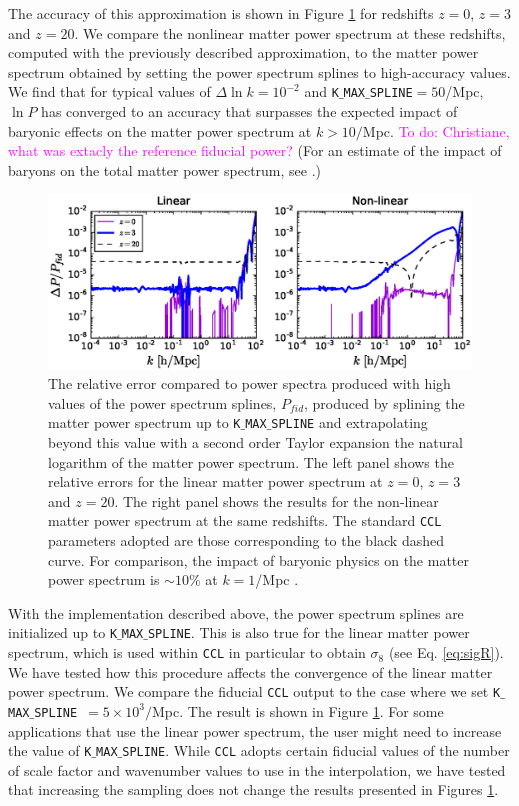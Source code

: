 \documentclass[\docopts]{\docclass}
\newcommand{\todo}[1]{\textcolor{magenta}{To do: #1}}
\newcommand{\ccl}{{\tt CCL}\xspace}
\begin{document}
The accuracy of this approximation is shown in Figure \ref{fig:NLextrapol} for redshifts $z=0$, $z=3$ and $z=20$. We compare the nonlinear matter power spectrum at these redshifts, computed with the previously described approximation, to the matter power spectrum obtained by setting the power spectrum splines to high-accuracy values. We find that for typical values of $\Delta \ln k=10^{-2}$ and {\tt K$\_$MAX$\_$SPLINE}$=50$/Mpc, $\ln P$ has converged to an accuracy that surpasses the expected impact of baryonic effects on the matter power spectrum at $k>10/$Mpc. \todo{Christiane, what was extacly the reference fiducial power?} (For an estimate of the impact of baryons on the total matter power spectrum, see \citealt{Schneider15}.) 

\begin{figure}
\centering
\includegraphics[width=1.0\textwidth]{plot_power.eps}
\caption{The relative error compared to power spectra produced with high values of the power spectrum splines, $P_{fid}$, produced by splining the matter power spectrum up to {\tt K$\_$MAX$\_$SPLINE} and extrapolating beyond this value with a second order Taylor expansion the natural logarithm of the matter power spectrum. The left panel shows the relative errors for the linear matter power spectrum at $z=0$, $z=3$ and $z=20$. The right panel shows the results for the non-linear matter power spectrum at the same redshifts. The standard \ccl parameters adopted are those corresponding to the black dashed curve. For comparison, the impact of baryonic physics on the matter power spectrum is $\sim 10\%$ at $k=1$/Mpc \citep{Schneider15}.}
\label{fig:NLextrapol}
\end{figure}

With the implementation described above, the power spectrum splines are initialized up to {\tt K$\_$MAX$\_$SPLINE}. This is also true for the linear matter power spectrum, which is used within \ccl in particular to obtain $\sigma_8$ (see Eq. \ref{eq:sigR}). We have tested how this procedure affects the convergence of the linear matter power spectrum. We compare the fiducial \ccl output to the case where we set {\tt K$\_$MAX$\_$SPLINE}~$=5\times 10^3/$Mpc. The result is shown in Figure \ref{fig:NLextrapol}. For some applications that use the linear power spectrum, the user might need to increase the value of {\tt K$\_$MAX$\_$SPLINE}. While \ccl adopts certain fiducial values of the number of scale factor and wavenumber values to use in the interpolation, we have tested that increasing the sampling does not change the results presented in Figures \ref{fig:NLextrapol}.
\end{document}
